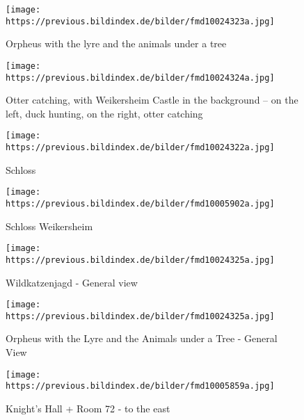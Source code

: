 \documentclass[
  a4paper,
]{book}
\begin{document}
\begin{figure*}
\begin{figure}[H]    
  \texttt{[image: https://previous.bildindex.de/bilder/fmd10024323a.jpg]}
  \caption{Orpheus with the lyre and the animals under a tree}
  \label{fig:{https://previous.bildindex.de/bilder/fmd10024323a.jpg}}
\end{figure}

\clearpage

\begin{figure}[H]    
  \texttt{[image: https://previous.bildindex.de/bilder/fmd10024324a.jpg]}
  \caption{Otter catching, with Weikersheim Castle in the background – on the left, duck hunting, on the right, otter catching}
  \label{fig:{https://previous.bildindex.de/bilder/fmd10024324a.jpg}}
\end{figure}

\clearpage

\begin{figure}[H]    
  \texttt{[image: https://previous.bildindex.de/bilder/fmd10024322a.jpg]}
  \caption{Schloss}
  \label{fig:{https://previous.bildindex.de/bilder/fmd10024322a.jpg}}
\end{figure}

\clearpage

\begin{figure}[H]    
  \texttt{[image: https://previous.bildindex.de/bilder/fmd10005902a.jpg]}
  \caption{Schloss Weikersheim}
  \label{fig:{https://previous.bildindex.de/bilder/fmd10005902a.jpg}}
\end{figure}

\clearpage

\begin{figure}[H]    
  \texttt{[image: https://previous.bildindex.de/bilder/fmd10024325a.jpg]}
  \caption{Wildkatzenjagd - General view}
  \label{fig:{https://previous.bildindex.de/bilder/fmd10024325a.jpg}}
\end{figure}

\clearpage

\begin{figure}[H]    
  \texttt{[image: https://previous.bildindex.de/bilder/fmd10024325a.jpg]}
  \caption{Orpheus with the Lyre and the Animals under a Tree - General View}
  \label{fig:{https://previous.bildindex.de/bilder/fmd10024325a.jpg}}
\end{figure}

\clearpage

\begin{figure}[H]    
  \texttt{[image: https://previous.bildindex.de/bilder/fmd10005859a.jpg]}
  \caption{Knight's Hall + Room 72 - to the east}
  \label{fig:{https://previous.bildindex.de/bilder/fmd10005859a.jpg}}
\end{figure}


\end{figure*}
\end{document}
